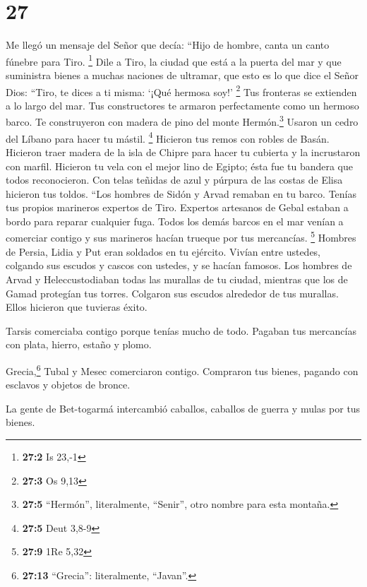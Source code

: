 \hypertarget{section-26}{%
\section{27}\label{section-26}}

 Me llegó un mensaje del Señor que decía: 
``Hijo de hombre, canta un canto fúnebre para Tiro. \footnote{\textbf{27:2}
  Is 23,-1}  Dile a Tiro, la ciudad que está a la puerta
del mar y que suministra bienes a muchas naciones de ultramar, que esto
es lo que dice el Señor Dios: ``Tiro, te dices a ti misma: `¡Qué hermosa
soy!' \footnote{\textbf{27:3} Os 9,13}  Tus fronteras se
extienden a lo largo del mar. Tus constructores te armaron perfectamente
como un hermoso barco.  Te construyeron con madera de pino
del monte Hermón.\footnote{\textbf{27:5} ``Hermón'', literalmente,
  ``Senir'', otro nombre para esta montaña.} Usaron un cedro del Líbano
para hacer tu mástil. \footnote{\textbf{27:5} Deut 3,8-9} 
Hicieron tus remos con robles de Basán. Hicieron traer madera de la isla
de Chipre para hacer tu cubierta y la incrustaron con marfil.
 Hicieron tu vela con el mejor lino de Egipto; ésta fue tu
bandera que todos reconocieron. Con telas teñidas de azul y púrpura de
las costas de Elisa hicieron tus toldos.  ``Los hombres de
Sidón y Arvad remaban en tu barco. Tenías tus propios marineros expertos
de Tiro.  Expertos artesanos de Gebal estaban a bordo para
reparar cualquier fuga. Todos los demás barcos en el mar venían a
comerciar contigo y sus marineros hacían trueque por tus mercancías.
\footnote{\textbf{27:9} 1Re 5,32}  Hombres de Persia,
Lidia y Put eran soldados en tu ejército. Vivían entre ustedes, colgando
sus escudos y cascos con ustedes, y se hacían famosos. 
Los hombres de Arvad y Heleccustodiaban todas las murallas de tu ciudad,
mientras que los de Gamad protegían tus torres. Colgaron sus escudos
alrededor de tus murallas. Ellos hicieron que tuvieras éxito.

 Tarsis comerciaba contigo porque tenías mucho de todo.
Pagaban tus mercancías con plata, hierro, estaño y plomo.

 Grecia,\footnote{\textbf{27:13} ``Grecia'':
  literalmente, ``Javan''.} Tubal y Mesec comerciaron contigo. Compraron
tus bienes, pagando con esclavos y objetos de bronce.

 La gente de Bet-togarmá intercambió caballos, caballos
de guerra y mulas por tus bienes.

